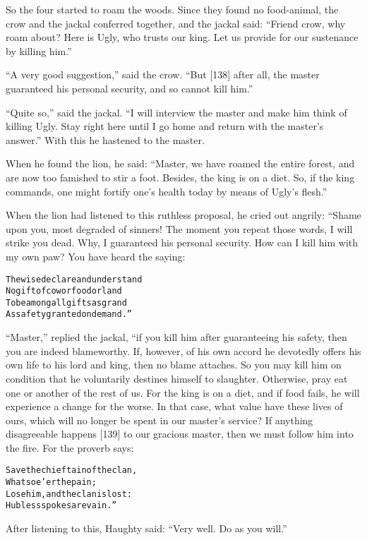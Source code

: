 \documentclass{article}
\renewenvironment{verbatim}{\begin{alltt}\normalfont\begin{centering}}{\end{centering}\end{alltt}}
\begin{document}
So the four started to roam the woods. Since they found no
food-animal, the crow and the jackal conferred together, and the
jackal said:
``Friend crow, why roam about? Here is Ugly, who trusts our king. Let us provide for our sustenance by killing him.''

``A very good suggestion,'' said the crow.
``But [138] after all, the master guaranteed his personal security, and so cannot kill him.''

``Quite so,'' said the jackal.
``I will interview the master and make him think of killing Ugly. Stay right here until I go home and return with the master's answer.''
With this he hastened to the master.

When he found the lion, he said:
``Master, we have roamed the entire forest, and are now too famished to stir a foot. Besides, the king is on a diet. So, if the king commands, one might fortify one's health today by means of Ugly's flesh.''

When the lion had listened to this ruthless proposal, he cried out
angrily: “Shame upon you, most degraded of sinners! The moment you
repeat those words, I will strike you dead. Why, I guaranteed his
personal security. How can I kill him with my own paw? You have
heard the saying:

\begin{verbatim}
The wise declare and understand
No gift of cow or food or land
To be among all gifts as grand
As safety granted on demand.”
\end{verbatim}
``Master,'' replied the jackal, “if you kill him after guaranteeing
his safety, then you are indeed blameworthy. If, however, of his
own accord he devotedly offers his own life to his lord and king,
then no blame attaches. So you may kill him on condition that he
voluntarily destines himself to slaughter. Otherwise, pray eat one
or another of the rest of us. For the king is on a diet, and if
food fails, he will experience a change for the worse. In that
case, what value have these lives of ours, which will no longer be
spent in our master's service? If anything disagreeable happens
[139] to our gracious master, then we must follow him into the
fire. For the proverb says:

\begin{verbatim}
Save the chieftain of the clan,
    Whatsoe'er the pain;
Lose him, and the clan is lost:
    Hubless spokes are vain.”
\end{verbatim}
After listening to this, Haughty said:
``Very well. Do as you will.''
\end{document}
